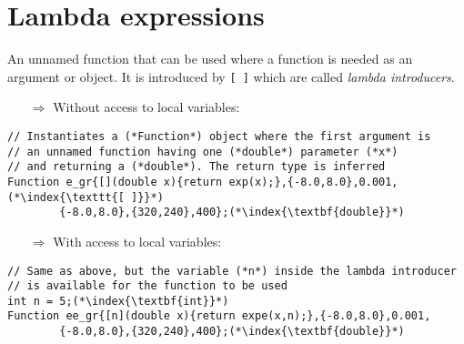\documentclass[10pt]{article}
\begin{document}
\section{Lambda expressions}
\small
An unnamed function that can be used where a function is needed as an argument or object.
It is introduced by \texttt{[ ]} which are called \emph{lambda introducers}.
\begin{enumerate}
\item[$\Rightarrow$] Without access to local variables:
\end{enumerate}
\begin{lstlisting}
// Instantiates a (*Function*) object where the first argument is
// an unnamed function having one (*double*) parameter (*x*)
// and returning a (*double*). The return type is inferred
Function e_gr{[](double x){return exp(x);},{-8.0,8.0},0.001,(*\index{\texttt{[ ]}}*)
        {-8.0,8.0},{320,240},400};(*\index{\textbf{double}}*)
\end{lstlisting}
\begin{enumerate}
\item[$\Rightarrow$] With access to local variables:
\end{enumerate}
\begin{lstlisting}
// Same as above, but the variable (*n*) inside the lambda introducer
// is available for the function to be used
int n = 5;(*\index{\textbf{int}}*)
Function ee_gr{[n](double x){return expe(x,n);},{-8.0,8.0},0.001,
        {-8.0,8.0},{320,240},400};(*\index{\textbf{double}}*)
 \end{lstlisting}
%
%
\end{document}
